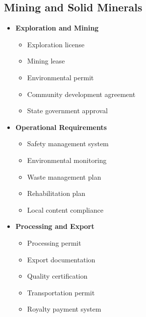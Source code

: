 \subsection{Mining and Solid Minerals}\label{subsec:mining-compliance}
\vspace{1em}

\begin{tcolorbox}[
    colback=white,
    colframe=primarydark,
    title=\textbf{Mining Sector Requirements},
    before skip=1em,
    after skip=1em
]
    \begin{itemize}[leftmargin=*,itemsep=0.5em]
        \item \textbf{Exploration and Mining}
        \begin{itemize}[itemsep=0.3em]
            \item Exploration license
            \item Mining lease
            \item Environmental permit
            \item Community development agreement
            \item State government approval
        \end{itemize}

        \vspace{0.5em}

        \item \textbf{Operational Requirements}
        \begin{itemize}[itemsep=0.3em]
            \item Safety management system
            \item Environmental monitoring
            \item Waste management plan
            \item Rehabilitation plan
            \item Local content compliance
        \end{itemize}

        \vspace{0.5em}

        \item \textbf{Processing and Export}
        \begin{itemize}[itemsep=0.3em]
            \item Processing permit
            \item Export documentation
            \item Quality certification
            \item Transportation permit
            \item Royalty payment system
        \end{itemize}
    \end{itemize}
\end{tcolorbox}

